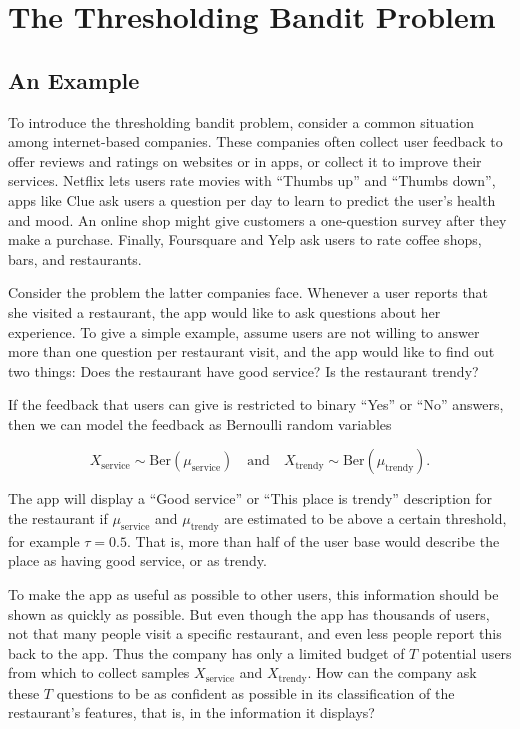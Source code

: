 \documentclass[11pt,]{article}
\begin{document}
\newpage

\section{\texorpdfstring{The Thresholding Bandit Problem
\label{chap:ThresholdingBanditProblem}}{The Thresholding Bandit Problem }}\label{the-thresholding-bandit-problem}

\subsection{An Example}\label{an-example}

To introduce the thresholding bandit problem, consider a common
situation among internet-based companies. These companies often collect
user feedback to offer reviews and ratings on websites or in apps, or
collect it to improve their services. Netflix lets users rate movies
with ``Thumbs up'' and ``Thumbs down'', apps like Clue ask users a
question per day to learn to predict the user's health and mood. An
online shop might give customers a one-question survey after they make a
purchase. Finally, Foursquare and Yelp ask users to rate coffee shops,
bars, and restaurants.

Consider the problem the latter companies face. Whenever a user reports
that she visited a restaurant, the app would like to ask questions about
her experience. To give a simple example, assume users are not willing
to answer more than one question per restaurant visit, and the app would
like to find out two things: Does the restaurant have good service? Is
the restaurant trendy?

If the feedback that users can give is restricted to binary ``Yes'' or
``No'' answers, then we can model the feedback as Bernoulli random
variables

\[
X_{\text{service}} \sim \text{Ber}(\mu_{\text{service}}) \quad \text{and} \quad X_{\text{trendy}} \sim \text{Ber}(\mu_{\text{trendy}}).
\]

The app will display a ``Good service'' or ``This place is trendy''
description for the restaurant if \(\mu_{\text{service}}\) and
\(\mu_{\text{trendy}}\) are estimated to be above a certain threshold,
for example \(\tau = 0.5\). That is, more than half of the user base
would describe the place as having good service, or as trendy.

To make the app as useful as possible to other users, this information
should be shown as quickly as possible. But even though the app has
thousands of users, not that many people visit a specific restaurant,
and even less people report this back to the app. Thus the company has
only a limited budget of \(T\) potential users from which to collect
samples \(X_{\text{service}}\) and \(X_{\text{trendy}}\). How can the
company ask these \(T\) questions to be as confident as possible in its
classification of the restaurant's features, that is, in the information
it displays?
\end{document}
